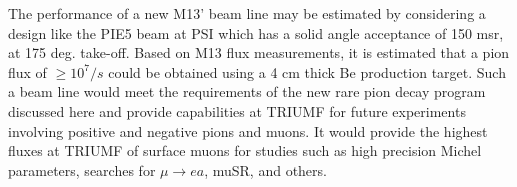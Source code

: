 The performance of a new M13' beam line may be estimated by considering a design like the PIE5\cite{PIE5} beam at PSI which has a solid angle acceptance of 150 msr, at 175 deg. take-off. Based on M13 flux measurements\cite{M13E}, it is estimated that a  pion flux of $\geq10^7/s$ could be obtained using a 4 cm thick Be production target. Such a beam line would meet the requirements of the new rare pion decay program discussed here and provide capabilities at TRIUMF for future  experiments involving positive and negative pions and muons. It would provide the highest fluxes at TRIUMF of surface muons for studies such as high precision Michel parameters, searches for $\mu \to e a$, muSR, and others.